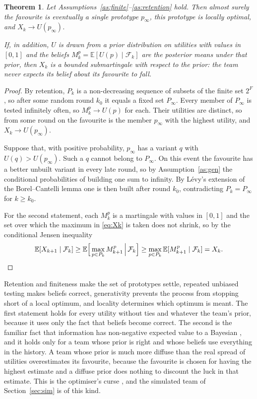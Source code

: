 \documentclass[preprint,review,11pt,authoryear]{elsarticle}
\newcommand{\E}{\mathbb{E}}
\newcommand{\filt}{\mathcal{F}}
\newcommand{\Pk}{P_k}
\newtheorem{theorem}{Theorem}
\theoremstyle{definition}
\begin{document}
\begin{theorem}
\label{thm:converge}
Let Assumptions~\ref{as:finite}--\ref{as:retention} hold. Then almost surely the favourite is eventually a single prototype $p_\infty$, this prototype is locally optimal, and $X_k\to U(p_\infty)$.

If, in addition, $U$ is drawn from a prior distribution on utilities with values in $[0,1]$ and the beliefs $M^p_k=\E[U(p)\mid\filt_k]$ are the posterior means under that prior, then $X_k$ is a bounded submartingale with respect to the prior: the team never expects its belief about its favourite to fall.
\end{theorem}

\begin{proof}
By retention, $\Pk$ is a non-decreasing sequence of subsets of the finite set $2^F$, so after some random round $k_0$ it equals a fixed set $P_\infty$. Every member of $P_\infty$ is tested infinitely often, so $M^p_k\to U(p)$ for each. Their utilities are distinct, so from some round on the favourite is the member $p_\infty$ with the highest utility, and $X_k\to U(p_\infty)$.

Suppose that, with positive probability, $p_\infty$ has a variant $q$ with $U(q)>U(p_\infty)$. Such a $q$ cannot belong to $P_\infty$. On this event the favourite has a better unbuilt variant in every late round, so by Assumption~\ref{as:gen} the conditional probabilities of building one sum to infinity. By L\'evy's extension of the Borel--Cantelli lemma \citep[Sec.~4.3]{durrett2019} one is then built after round $k_0$, contradicting $\Pk=P_\infty$ for $k\ge k_0$.

For the second statement, each $M^p_k$ is a martingale with values in $[0,1]$ and the set over which the maximum in \eqref{eq:Xk} is taken does not shrink, so by the conditional Jensen inequality
\[
\E[X_{k+1}\mid\filt_k]\ge\E\Big[\max_{p\in \Pk}M^p_{k+1}\,\Big|\,\filt_k\Big]\ge\max_{p\in \Pk}\E[M^p_{k+1}\mid\filt_k]=X_k .\qedhere
\]
\end{proof}

Retention and finiteness make the set of prototypes settle, repeated unbiased testing makes beliefs correct, generativity prevents the process from stopping short of a local optimum, and locality determines which optimum is meant. The first statement holds for every utility without ties and whatever the team's prior, because it uses only the fact that beliefs become correct. The second is the familiar fact that information has non-negative expected value to a Bayesian \citep{degroot2004}, and it holds only for a team whose prior is right and whose beliefs use everything in the history. A team whose prior is much more diffuse than the real spread of utilities overestimates its favourite, because the favourite is chosen for having the highest estimate and a diffuse prior does nothing to discount the luck in that estimate. This is the optimiser's curse \citep{smithwinkler2006}, and the simulated team of Section~\ref{sec:sim} is of this kind.
\end{document}
